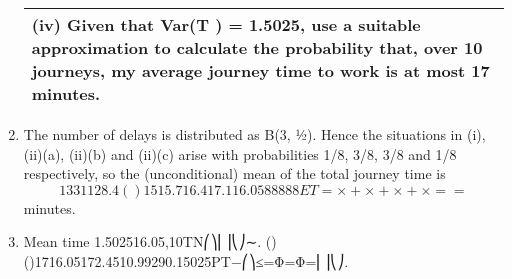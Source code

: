 \documentclass[a4paper,12pt]{article}
\begin{document}
\begin{enumerate}
    \begin{table}[ht!]
     \centering
     \begin{tabular}{|p{15cm}|}
     \hline        
\noindent (iv) Given that Var(T ) = 1.5025, use a suitable approximation to calculate the probability that, over 10 journeys, my average journey time to work is at most 17 minutes.
\\ \hline
      \end{tabular}
    \end{table}
\item The number of delays is distributed as B(3, ½). Hence the situations in (i), (ii)(a), (ii)(b) and (ii)(c) arise with probabilities 1/8, 3/8, 3/8 and 1/8 respectively, so the (unconditional) mean of the total journey time is
\[1331128.4()1515.716.417.116.0588888ET=×+×+×+×==\] minutes.
\item Mean time 1.502516.05,10TN⎛⎞⎜⎟⎝⎠∼.
()()1716.05172.4510.99290.15025PT−⎛⎞≤=Φ=Φ=⎜⎟⎝⎠.
\end{enumerate}
\end{document}
